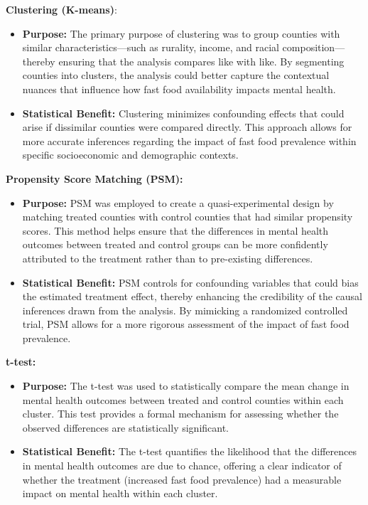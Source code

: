 \documentclass[letterpaper, 11pt]{report}
\begin{document}
\noindent \textbf{Clustering (K-means)}: 

\begin{itemize}
    \item \textbf{Purpose:} The primary purpose of clustering was to group counties with similar characteristics—such as rurality, income, and racial composition—thereby ensuring that the analysis compares like with like. By segmenting counties into clusters, the analysis could better capture the contextual nuances that influence how fast food availability impacts mental health.

    \item \textbf{Statistical Benefit:} Clustering minimizes confounding effects that could arise if dissimilar counties were compared directly. This approach allows for more accurate inferences regarding the impact of fast food prevalence within specific socioeconomic and demographic contexts.
\end{itemize}

\noindent \textbf{Propensity Score Matching (PSM):}

\begin{itemize}
\item \textbf{Purpose:} PSM was employed to create a quasi-experimental design by matching treated counties with control counties that had similar propensity scores. This method helps ensure that the differences in mental health outcomes between treated and control groups can be more confidently attributed to the treatment rather than to pre-existing differences.

\item \textbf{Statistical Benefit:} PSM controls for confounding variables that could bias the estimated treatment effect, thereby enhancing the credibility of the causal inferences drawn from the analysis. By mimicking a randomized controlled trial, PSM allows for a more rigorous assessment of the impact of fast food prevalence.

\end{itemize}

\noindent \textbf{t-test:}
\begin{itemize}
    \item \textbf{Purpose:} The t-test was used to statistically compare the mean change in mental health outcomes between treated and control counties within each cluster. This test provides a formal mechanism for assessing whether the observed differences are statistically significant.
    \item \textbf{Statistical Benefit:} The t-test quantifies the likelihood that the differences in mental health outcomes are due to chance, offering a clear indicator of whether the treatment (increased fast food prevalence) had a measurable impact on mental health within each cluster.

\end{itemize}
\end{document}
